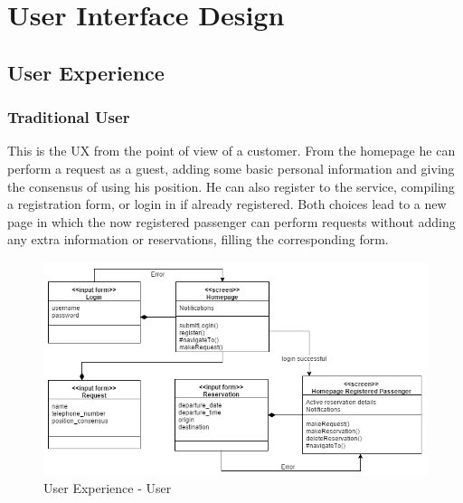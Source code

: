 \section{User Interface Design}
\subsection{User Experience}
\subsubsection{Traditional User}
This is the UX from the point of view of a customer. From the homepage he can perform a request as a guest, adding some basic personal information and giving the consensus of using his position. He can also register to the service, compiling a registration form, or login in if already registered. Both choices lead to a new page in which the now registered passenger can perform requests without adding any extra information or reservations, filling the corresponding form.
\begin{figure}[h!]
	\begin{center}
		\includegraphics[width=1\linewidth]{../SE2_IMAGES/UserUX}
		\caption{User Experience - User}
	\end{center}
\end{figure}
\newpage

